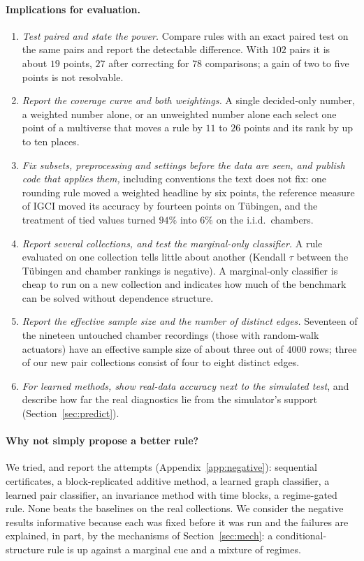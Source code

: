 \paragraph{Implications for evaluation.}
\begin{enumerate}
\item \emph{Test paired and state the power.} Compare rules with an exact paired test on the same pairs and report the detectable difference. With $102$ pairs it is about $19$ points, $27$ after correcting for $78$ comparisons; a gain of two to five points is not resolvable.
\item \emph{Report the coverage curve and both weightings.} A single decided-only number, a weighted number alone, or an unweighted number alone each select one point of a multiverse that moves a rule by $11$ to $26$ points and its rank by up to ten places.
\item \emph{Fix subsets, preprocessing and settings before the data are seen, and publish code that applies them,} including conventions the text does not fix: one rounding rule moved a weighted headline by six points, the reference measure of IGCI moved its accuracy by fourteen points on T\"ubingen, and the treatment of tied values turned $94\%$ into $6\%$ on the i.i.d.\ chambers.
\item \emph{Report several collections, and test the marginal-only classifier.} A rule evaluated on one collection tells little about another (Kendall $\tau$ between the T\"ubingen and chamber rankings is negative). A marginal-only classifier is cheap to run on a new collection and indicates how much of the benchmark can be solved without dependence structure.
\item \emph{Report the effective sample size and the number of distinct edges.} Seventeen of the nineteen untouched chamber recordings (those with random-walk actuators) have an effective sample size of about three out of $4000$ rows; three of our new pair collections consist of four to eight distinct edges.
\item \emph{For learned methods, show real-data accuracy next to the simulated test}, and describe how far the real diagnostics lie from the simulator's support (Section~\ref{sec:predict}).
\end{enumerate}

\paragraph{Why not simply propose a better rule?} We tried, and report the attempts (Appendix~\ref{app:negative}): sequential certificates, a block-replicated additive method, a learned graph classifier, a learned pair classifier, an invariance method with time blocks, a regime-gated rule. None beats the baselines on the real collections. We consider the negative results informative because each was fixed before it was run and the failures are explained, in part, by the mechanisms of Section~\ref{sec:mech}: a conditional-structure rule is up against a marginal cue and a mixture of regimes.

